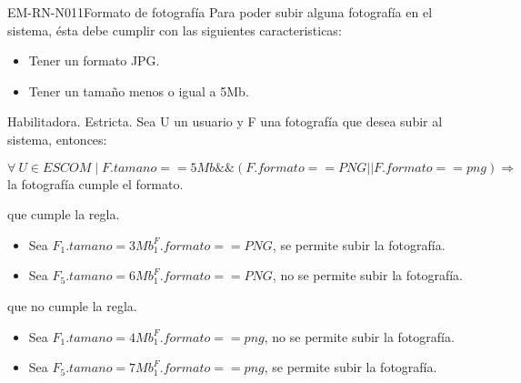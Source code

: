 \begin{BussinesRule}{EM-RN-N011}{Formato de fotografía}
	\BRitem[Descripción:] Para poder subir alguna fotografía en el sistema, ésta debe
	cumplir con las siguientes caracteristicas: 
		\begin{itemize}
			\item Tener un formato JPG. 
			\item Tener un tamaño menos o igual a 5Mb.
		\end{itemize}
	\BRitem[Tipo: ] Habilitadora.
	\BRitem[Nivel: ] Estricta.
	\BRitem[Sentenia: ] Sea U un usuario y F una 
	fotografía que desea subir al sistema, entonces:
	\begin{center}
		$\forall \: U \in ESCOM \mid F.tamano == 5Mb \&\& (F.formato == PNG || F.formato == png) \Rightarrow$ la fotografía cumple el formato.
	\end{center}
	 que cumple la regla.
		\begin{itemize}
			\item Sea $F_{1}.tamano = 3Mb ^ F_{1}.formato == PNG$, se permite
			subir la fotografía.
			\item Sea $F_{5}.tamano = 6Mb ^ F_{1}.formato == PNG$, no se permite
			subir la fotografía.
		\end{itemize}
	 que no cumple la regla.
		\begin{itemize}
			\item Sea $F_{1}.tamano = 4Mb ^ F_{1}.formato == png$, no se permite
			subir la fotografía.
			\item Sea $F_{5}.tamano = 7Mb ^ F_{1}.formato == png$, se permite
			subir la fotografía.
		\end{itemize}

\end{BussinesRule}